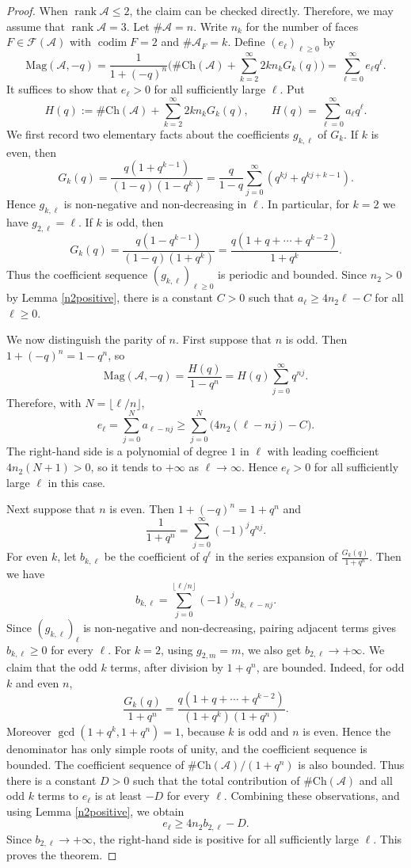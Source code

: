 \documentclass{amsart}
\numberwithin{equation}{section}
\theoremstyle{plain}
\theoremstyle{remark}
\theoremstyle{definition}
\numberwithin{equation}{section}
\newcommand{\A}{\mathcal{A}}
\newcommand{\FF}{\mathcal{F}}
\newcommand{\Mag}{\mathrm{Mag}}
\newcommand{\Ch}{\mathrm{Ch}}
\DeclareMathOperator{\rank}{rank}
\DeclareMathOperator{\codim}{codim}
\begin{document}
\begin{proof}
When $\rank\A\leq 2$, the claim can be checked directly.
Therefore, we may assume that $\rank \A=3$.
Let $\#\A=n$.
Write $n_k$ for the number of faces $F\in \FF(\A)$ with $\codim F=2$ and $\#\A_F=k$.
Define $(e_\ell)_{\ell\geq 0}$ by
\[
\Mag(\A,-q)=\dfrac{1}{1+(-q)^n}\biggl(\#\Ch(\A)+\sum_{k=2}^\infty 2kn_kG_k(q)\biggr)=\sum_{\ell=0}^\infty e_\ell q^\ell.
\]
It suffices to show that $e_\ell>0$ for all sufficiently large $\ell$.
Put
\[
H(q):=\#\Ch(\A)+\sum_{k=2}^{\infty}2k n_kG_k(q),\qquad
H(q)=\sum_{\ell=0}^\infty a_\ell q^\ell .
\]
We first record two elementary facts about the coefficients $g_{k,\ell}$ of $G_k$.
If $k$ is even, then
\[
G_k(q)=\frac{q(1+q^{k-1})}{(1-q)(1-q^k)}
      =\frac{q}{1-q}\sum_{j=0}^\infty\left(q^{kj}+q^{kj+k-1}\right).
\]
Hence $g_{k,\ell}$ is non-negative and non-decreasing in $\ell$.  In particular,
for $k=2$ we have $g_{2,\ell}=\ell$.
If $k$ is odd, then
\[
G_k(q)=\frac{q(1-q^{k-1})}{(1-q)(1+q^k)}
      =\frac{q(1+q+\cdots+q^{k-2})}{1+q^k}.
\]
Thus the coefficient sequence $(g_{k,\ell})_{\ell\ge 0}$ is periodic and bounded.
Since $n_2>0$ by Lemma \ref{n2positive}, there is a constant
$C>0$ such that $a_\ell\ge 4n_2\ell-C$ for all $\ell\ge 0$.

We now distinguish the parity of $n$.
First suppose that $n$ is odd.  Then $1+(-q)^n=1-q^n$, so
\[
\Mag(\A,-q)=\frac{H(q)}{1-q^n}=H(q)\sum_{j=0}^\infty q^{nj}.
\]
Therefore, with $N=\lfloor \ell/n\rfloor$,
\[
e_\ell=\sum_{j=0}^{N}a_{\ell-nj}
     \ge \sum_{j=0}^{N}\bigl(4n_2(\ell-nj)-C\bigr).
\]
The right-hand side is a polynomial of degree $1$ in $\ell$ with leading coefficient $4n_2(N+1)>0$, so it tends to $+\infty$ as $\ell\to\infty$.
Hence $e_\ell>0$ for all
sufficiently large $\ell$ in this case.

Next suppose that $n$ is even.  Then $1+(-q)^n=1+q^n$ and
\[
\frac{1}{1+q^n}=\sum_{j=0}^\infty (-1)^j q^{nj}.
\]
For even $k$, let $b_{k,\ell}$ be the coefficient of $q^\ell$ in the series expansion of $\frac{G_k(q)}{1+q^n}$.
Then we have
\[
b_{k,\ell}=\sum_{j=0}^{\lfloor \ell/n\rfloor}(-1)^jg_{k,\ell-nj}.
\]
Since $(g_{k,\ell})_\ell$ is non-negative and non-decreasing, pairing adjacent
terms gives $b_{k,\ell}\ge 0$ for every $\ell$.
For $k=2$, using $g_{2,m}=m$, we also get $b_{2,\ell}\to +\infty$.
We claim that the odd $k$ terms, after division by $1+q^n$, are
bounded.  Indeed, for odd $k$ and even $n$,
\[
\frac{G_k(q)}{1+q^n}
 =\frac{q(1+q+\cdots+q^{k-2})}{(1+q^k)(1+q^n)}.
\]
Moreover $\gcd(1+q^k,1+q^n)=1$, because $k$ is odd and $n$ is even.  Hence the
denominator has only simple roots of unity, and the coefficient sequence is
bounded.  The coefficient sequence of $\#\Ch(\A)/(1+q^n)$ is also bounded.  Thus there
is a constant $D>0$ such that the total contribution of $\#\Ch(\A)$ and all odd $k$
terms to $e_\ell$ is at least $-D$ for every $\ell$.
Combining these observations, and using Lemma \ref{n2positive}, we obtain
\[
e_\ell\ge 4n_2 b_{2,\ell}-D.
\]
Since $b_{2,\ell}\to +\infty$, the right-hand side is positive for all
sufficiently large $\ell$.  This proves the theorem.
\end{proof}
\end{document}
